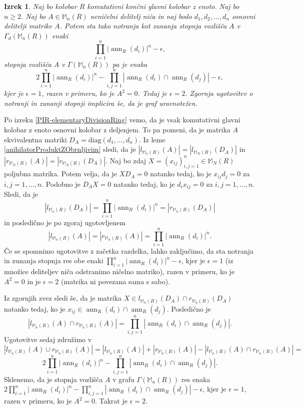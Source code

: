 \documentclass[a4paper, 12pt]{amsart}
\theoremstyle{definition} %
\theoremstyle{plain} %
\newtheorem{izrek}[definicija]{Izrek}
\newcommand{\M}{\mathbb M}
\DeclareMathOperator{\ann}{ann}
\begin{document}
\begin{izrek}
\label{inDegreeOutDegree}
Naj bo kolobar $R$ komutativni končni glavni kolobar z enoto. Naj bo $n \ge 2$. Naj bo $A\in \M_n(R)$ neničelni delitelj niča in naj bodo $d_1,d_2, \dots,d_n$ osnovni delitelji matrike $A$. Potem sta tako notranja kot zunanja stopnja vozlišča $A$ v $\Gamma_d(\M_n(R))$ enaki
$$
\prod_{i=1}^n |\ann_R(d_i)|^n - \epsilon,
$$ 
stopnja vozlišča $A$ v $\Gamma(\M_n(R))$ pa je enaka
$$
2\prod_{i=1}^n |\ann_R(d_i)|^n - \prod_{i,j=1}^n |\ann_R(d_i) \cap \ann_R(d_j)| - \epsilon,
$$
kjer je $\epsilon =1$, razen v primeru, ko je $A^2 = 0$. Tedaj je $\epsilon = 2$. Zgornja ugotovitev o notranji in zunanji stopnji implicira še, da je graf uravnotežen.
\end{izrek}
 
\proof
Po izreku  \ref{PIR-elementaryDivisionRing} vemo, da je vsak komutativni glavni kolobar z enoto osnovni kolobar z deljenjem. To pa pomeni, da je matrika $A$ ekvivalentna matriki $D_A= \text{diag}(d_1,\dots,d_n)$. Iz leme \ref{anihilatorProduktZObrnljivim} sledi, da je $|l_{\M_n(R)}(A)| = |l_{\M_N(R)}(D_A)|$ in $|r_{\M_N(R)}(A)| = |r_{\M_N(R)}(D_A)|$. Naj bo zdaj $X=(x_{ij})_{i,j=1}^n\in \M_N(R)$ poljubna matrika. Potem velja, da je $XD_A = 0$ natanko tedaj, ko je $x_{ij}d_j = 0$ za $i,j = 1, \dots, n$. Podobno je $D_AX = 0$ natanko tedaj, ko je $d_i x_{ij} =0 $ za $i,j=1,\dots,n$. Sledi, da je 
$$
|l_{\M_n(R)}(D_A)| = \prod_{i=1}^n |\ann_R(d_i)|^n = |r_{\M_n(R)}(D_A)|
$$
in posledično je po zgoraj ugotovljenem
$$
|l_{\M_n(R)}(A)|= |r_{\M_n(R)}(A)| = \prod_{i=1}^n |\ann_R(d_i)|^n .
$$
Če se spomnimo ugotovitve z začetka razdelka, lahko zaključimo, da sta notranja in zunanja stopnja res obe enaki $\prod_{i=1}^n  |\ann_R(d_i)|^n - \epsilon$, kjer je $\epsilon = 1$ (iz množice deliteljev niča odstranimo ničelno matriko), razen v primeru, ko je $A^2 = 0$ in je $\epsilon = 2$ (matrika ni povezana sama s sabo). 

Iz zgornjih zvez sledi še, da je matrika $X\in l_{\M_n(R)}(D_A)\cap r_{\M_n(R)}(D_A)$ natanko tedaj, ko je $x_{ij} \in  \ann_R(d_i)\cap \ann_R(d_j)$. Posledično je 
$$
|l_{\M_n(R)}(A) \cap r_{\M_n(R)}(A)| = \prod_{i,j=1}^n | \ann_R(d_i) \cap \ann_R(d_j)|.
$$
Ugotovitve sedaj združimo v 
$$
|l_{\M_n(R)}(A) \cup r_{\M_n(R)}(A)| = |l_{\M_n(R)}(A)|  + |r_{\M_n(R)}(A)| - |l_{\M_n(R)}(A) \cap r_{\M_n(R)}(A)|=
$$
$$
2\prod_{i=1}^n |\ann_R(d_i)|^n - \prod_{i,j=1}^n |\ann_R(d_i) \cap \ann_R(d_j)|.
$$
Sklenemo, da je stopnja vozlišča $A$ v grafu $\Gamma(\M_n(R))$ res enaka $2\prod_{i=1}^n |\ann_R(d_i)|^n - \prod_{i,j=1}^n |\ann_R(d_i) \cap \ann_R(d_j)| -\epsilon$, kjer je $\epsilon=1$, razen v primeru, ko je $A^2 = 0$. Takrat je $\epsilon=2$.
\endproof
\end{document}
